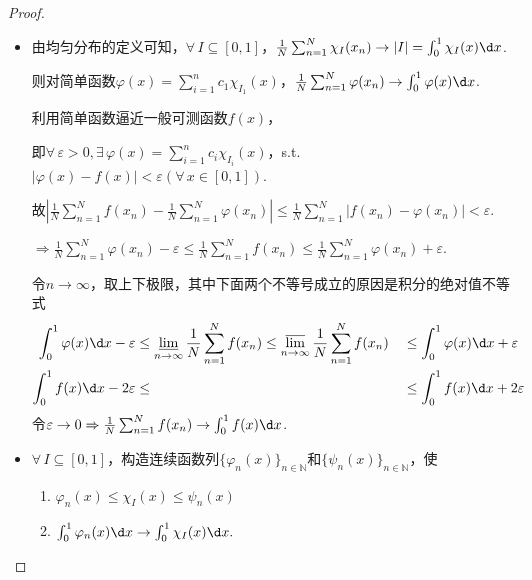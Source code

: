 \begin{proof}
    \begin{itemize}
        \item[“$\Rightarrow$”] 由均匀分布的定义可知，$\forall\, I \subseteq [0,1]$，$\frac{1}{N}\sum_{n=1}^N{\chi_{I}(x_n)} \to |I| = \int_0^1{\chi_{I}(x)}\d x$.\par
        则对简单函数$\varphi(x)=\sum_{i=1}^n{c_1\chi_{I_1}(x)}$，$\frac{1}{N}\sum_{n=1}^N{\varphi(x_n)}\to \int_{0}^{1}{\varphi(x)}\d x$.\par
        利用简单函数逼近一般可测函数$f(x)$， \par
        即$\forall\, \varepsilon>0,\exists\, \varphi(x)=\sum_{i=1}^n{c_i\chi_{I_i}(x)}$，s.t. $|\varphi(x)-f(x)| < \varepsilon(\forall\, x\in [0,1])$.\par
        故$\left\lvert \frac{1}{N}\sum_{n=1}^N{f(x_n)} - \frac{1}{N}\sum_{n=1}^N{\varphi(x_n)} \right\rvert \leqslant \frac{1}{N}\sum_{n=1}^N{\left\lvert f(x_n)-\varphi(x_n) \right\rvert} < \varepsilon$.\par
        $\Rightarrow \frac{1}{N}\sum_{n=1}^N{\varphi(x_n)} - \varepsilon \leq \frac{1}{N}\sum_{n=1}^N{f(x_n)} \leq \frac{1}{N}\sum_{n=1}^N{\varphi(x_n)} + \varepsilon$.\par
        令$n\to\infty$，取上下极限，其中下面两个不等号成立的原因是积分的绝对值不等式
        \begin{alignat*}{2}
            \int_0^1{\varphi(x)}\d x - \varepsilon &\leq \varliminf_{n\to\infty}{\frac{1}{N}\sum_{n=1}^N{f(x_n)}} \leq \varlimsup_{n\to\infty}{\frac{1}{N}\sum_{n=1}^N{f(x_n)}} &&\leq \int_0^1{\varphi(x)}\d x + \varepsilon  \\
            \int_0^1{f(x)}\d x - 2\varepsilon &\leq &&\leq \int_0^1{f(x)}\d x + 2\varepsilon
        \end{alignat*}
        令$\varepsilon\to 0 \Rightarrow \frac{1}{N}\sum_{n=1}^N{f(x_n)}\to \int_{0}^{1}{f(x)}\d x$.\par
    \end{itemize}
    \begin{minipage}[t]{0.8\textwidth}
    \begin{itemize}
        \item[“$\Leftarrow$"] $\forall\, I \subseteq [0,1]$，构造连续函数列$\{\varphi_n(x)\}_{n\in\mathbb{N}}$和$\{\psi_n(x)\}_{n\in\mathbb{N}}$，使
        \begin{enumerate}[(1)]
            \item $\varphi_n(x) \leq \chi_{I}(x) \leq \psi_n(x)$
            \item $\int_0^1{\varphi_n(x)}\d x \to \int_0^1{\chi_{I}(x)}\d x.$\par

\end{enumerate}
\end{itemize}
\end{minipage}
\end{proof}
